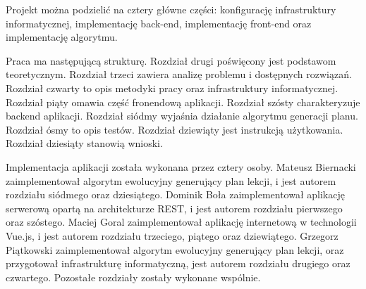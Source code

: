 Projekt można podzielić na cztery główne części: konfigurację infrastruktury informatycznej, implementację back-end, implementację front-end oraz implementację algorytmu.

Praca ma następującą strukturę. Rozdział drugi poświęcony jest podstawom teoretycznym. Rozdział trzeci zawiera analizę problemu i dostępnych rozwiązań. Rozdział czwarty to opis metodyki pracy oraz infrastruktury informatycznej. Rozdział piąty omawia część fronendową aplikacji. Rozdział szósty charakteryzuje backend aplikacji. Rozdział siódmy wyjaśnia działanie algorytmu generacji planu. Rozdział ósmy to opis testów. Rozdział dziewiąty jest instrukcją użytkowania. Rozdział dziesiąty stanowią wnioski. 

Implementacja aplikacji została wykonana przez cztery osoby.
Mateusz Biernacki zaimplementował algorytm ewolucyjny generujący plan lekcji, i jest autorem rozdziału siódmego oraz dziesiątego.
Dominik Boła zaimplementował aplikację serwerową opartą na architekturze REST, i jest autorem rozdziału pierwszego oraz szóstego.
Maciej Goral zaimplementował aplikację internetową w technologii Vue.js, i jest autorem rozdziału trzeciego, piątego oraz dziewiątego.
Grzegorz Piątkowski zaimplementował algorytm ewolucyjny generujący plan lekcji, oraz przygotował infrastrukturę informatyczną, jest autorem rozdziału drugiego oraz czwartego.
Pozostałe rozdziały zostały wykonane wspólnie.
